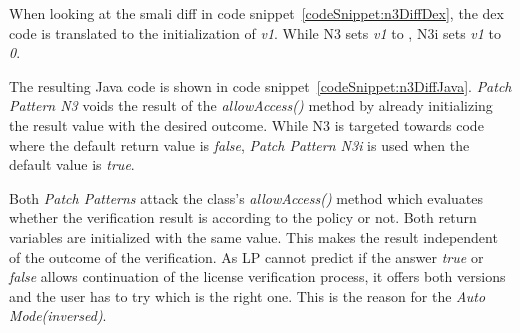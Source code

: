 


When looking at the smali diff in code snippet~\ref{codeSnippet:n3DiffDex}, the dex code is translated to the initialization of \textit{v1}.
While N3 sets \textit{v1} to , N3i sets \textit{v1} to \textit{0}.
\newline

The resulting Java code is shown in code snippet~\ref{codeSnippet:n3DiffJava}.
\textit{Patch Pattern N3} voids the result of the \textit{allowAccess()} method by already initializing the result value with the desired outcome.
While N3 is targeted towards code where the default return value is \textit{false}, \textit{Patch Pattern N3i} is used when the default value is \textit{true}.
\newline

Both \textit{Patch Patterns} attack the class's \textit{allowAccess()} method which evaluates whether the verification result is according to the policy or not.
Both return variables are initialized with the same value.
This makes the result independent of the outcome of the verification.
As LP cannot predict if the answer \textit{true} or \textit{false} allows continuation of the license verification process, it offers both versions and the user has to try which is the right one.
This is the reason for the \textit{Auto Mode(inversed)}.


